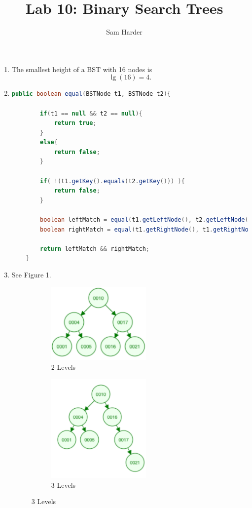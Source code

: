 \documentclass{article}
\title{Lab 10: Binary Search Trees}
\author{Sam Harder}
\begin{document}
	\maketitle
	\begin{enumerate}
		\item The smallest height of a BST with 16 nodes is 
		\[ \boxed{\lg (16)  = 4.}  \]
		\item 
		\leavevmode
				\begin{lstlisting}[language=Java]
	public boolean equal(BSTNode t1, BSTNode t2){
	
		if(t1 == null && t2 == null){
			return true;
		}
		else{
			return false;
		}
	
		if( !(t1.getKey().equals(t2.getKey())) ){
			return false;
		}
		
		boolean leftMatch = equal(t1.getLeftNode(), t2.getLeftNode());
		boolean rightMatch = equal(t1.getRightNode(), t1.getRightNode());
		
		return leftMatch && rightMatch;
	}
		\end{lstlisting}
		
		\item See Figure 1.
		\begin{figure}[h]
			\begin{subfigure}{0.6\textwidth}
				\centering
				\includegraphics[width=0.6\textwidth]{2level.png}
				\caption{2 Levels}
			\end{subfigure}
			\begin{subfigure}{0.6\textwidth}
				\centering
				\includegraphics[width=0.6\textwidth]{3level.png}
				\caption{3 Levels}
			\end{subfigure}
			

\end{figure}
\end{enumerate}
\end{document}
